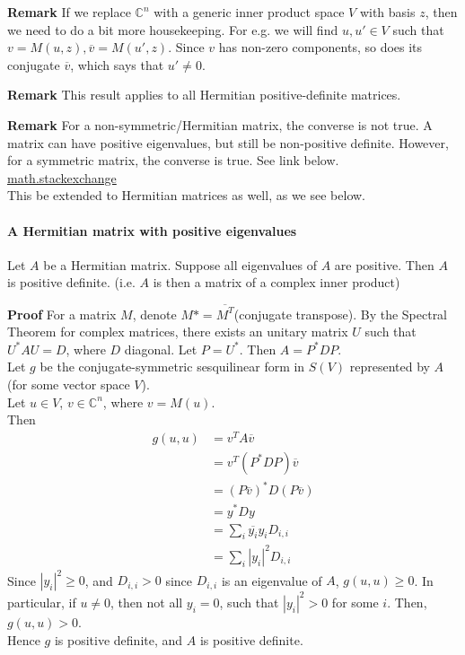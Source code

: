 \documentclass{article}
\begin{document}
\textbf{Remark} If we replace $\mathbb{C}^n$ with a generic inner product space $V$ with basis $z$, then we need to do a bit more housekeeping. For e.g. we will find $u,u'\in V$ such that $v=M(u,z), \overline{v} = M(u',z)$. Since $v$ has non-zero components, so does its conjugate $\overline{v}$, which says that $u'\neq 0$.

\textbf{Remark} This result applies to all Hermitian positive-definite matrices.

\textbf{Remark} For a non-symmetric/Hermitian matrix, the converse is not true. A matrix can have positive eigenvalues, but still be non-positive definite. However, for a symmetric matrix, the converse is true. See link below. \\
\href{https://math.stackexchange.com/questions/1434167/proving-that-a-symmetric-matrix-is-positive-definite-iff-all-eigenvalues-are-pos}{math.stackexchange}\\
This be extended to Hermitian matrices as well, as we see below. 

\paragraph{A Hermitian matrix with positive eigenvalues} Let $A$ be a Hermitian matrix. Suppose all eigenvalues of $A$ are positive. Then $A$ is positive definite. (i.e. $A$ is then a matrix of a complex inner product) 

\textbf{Proof} For a matrix $M$, denote $M*=\overline{M^T}$(conjugate transpose). By the Spectral Theorem for complex matrices, there exists an unitary matrix $U$ such that $U^*AU=D$, where $D$ diagonal. Let $P=U^*$. Then $A=P^*DP$.\\
Let $g$ be the conjugate-symmetric sesquilinear form in $S(V)$ represented by $A$ (for some vector space $V$).\\
Let $u\in V$, $v\in \mathbb{C}^n$, where $v=M(u)$. \\
Then 
\begin{align*}
	g(u,u) &= v^TA\overline{v} \\
	&= v^T(P^*DP)\overline{v} \\
	&= (P\overline{v})^*D(P\overline{v}) \\
	&= y^*Dy\\
	&= \sum_i \overline{y_i}y_i D_{i,i}\\
	&= \sum_i |y_i|^2 D_{i,i}
\end{align*}
Since $|y_i|^2\geq 0$, and $D_{i,i} > 0$ since $D_{i,i}$ is an eigenvalue of $A$, $g(u,u)\geq 0$. In particular, if $u\neq 0$, then not all $y_i=0$, such that $|y_i|^2 > 0$ for some $i$. Then, $g(u,u)>0$.\\
Hence $g$ is positive definite, and $A$ is positive definite.
\end{document}
